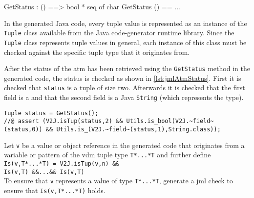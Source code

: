 \begin{vdmsl}[style=customVdm,caption={The signature of the
\texttt{GetStatus} operation.},label={lst:vdmTuple}]
GetStatus : () ==> bool * seq of char
GetStatus () == ...
\end{vdmsl}



In the generated Java code, every tuple value is represented as an
instance of the \texttt{Tuple} class available from the Java code-generator
runtime library. Since the \texttt{Tuple} class represents
tuple values in general, each instance of this class must be checked
against the specific tuple type that it originates from.

After the status of the \ac{atm} has been retrieved using the
\texttt{GetStatus} method in the generated code, the status is checked
as shown in \autoref{lst:jmlAtmStatus}. First it is checked that
\texttt{status} is a tuple of size two. Afterwards it is checked that
the first field is a  and that the second field is a Java
\texttt{String} (which represents the \texttt{} type).

\begin{lstlisting}[style=customJml,caption={Checking the \ac{atm}
status in the generated code.},label={lst:jmlAtmStatus}]
Tuple status = GetStatus();
//@ assert (V2J.isTup(status,2) && Utils.is_bool(V2J.~field~(status,0)) && Utils.is_(V2J.~field~(status,1),String.class));
\end{lstlisting}

 {Let \texttt{v} be a value or
  object reference in the generated code that originates from a
  variable or pattern of the \ac{vdm} tuple type
  \texttt{T*...*T} and further define\\
  \texttt{Is(v,T*...*T) = V2J.isTup(v,n) \&\&\\
    Is(v,T) \&\&...\&\& Is(v,T)}\\ To ensure that
  \texttt{v} represents a value of type \texttt{T*...*T},
  generate a \ac{jml} check to ensure that
  \texttt{Is(v,T*...*T)} holds.}

